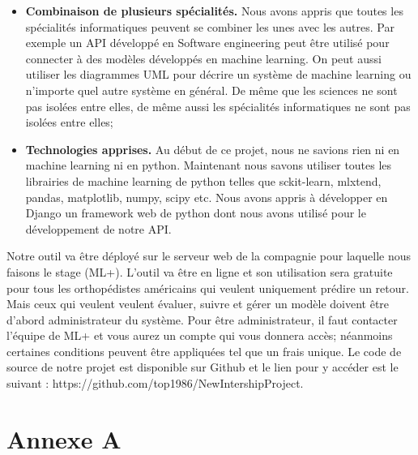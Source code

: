 \documentclass[12pt, french]{report}
\begin{document}
\begin{itemize}
\item \textbf{Combinaison de plusieurs spécialités.} Nous avons appris que toutes les spécialités informatiques peuvent se combiner les unes avec les autres. Par exemple un API développé en Software engineering peut être utilisé pour connecter à des modèles développés en machine learning. On peut aussi utiliser les diagrammes UML pour décrire un système de machine learning ou n'importe quel autre système en général. De même que les sciences ne sont pas isolées entre elles, de même aussi les spécialités informatiques ne sont pas isolées entre elles;
\item \textbf{Technologies apprises.}  Au début de ce projet, nous ne savions rien ni en machine learning ni en python. Maintenant nous savons utiliser toutes les librairies de machine learning de python telles que sckit-learn, mlxtend, pandas, matplotlib, numpy, scipy etc. Nous avons appris à développer en Django un framework web de python dont nous avons utilisé pour le développement de notre API. 
\end{itemize}

Notre outil va être déployé sur le serveur web de la compagnie pour laquelle nous faisons le stage (ML+). L'outil va être en ligne et son utilisation sera gratuite pour tous les orthopédistes américains qui veulent uniquement prédire un retour. Mais ceux qui veulent veulent évaluer, suivre et gérer un modèle doivent être d'abord administrateur du système. Pour être administrateur, il faut contacter l'équipe de ML+ et vous aurez un compte qui vous donnera accès; néanmoins certaines conditions peuvent être appliquées tel que un frais unique. Le code de source de notre projet est disponible sur Github et le lien pour y accéder est le suivant : https://github.com/top1986/NewIntershipProject.   


\newpage

\appendix
\chapter{Annexe A}

\end{document}
